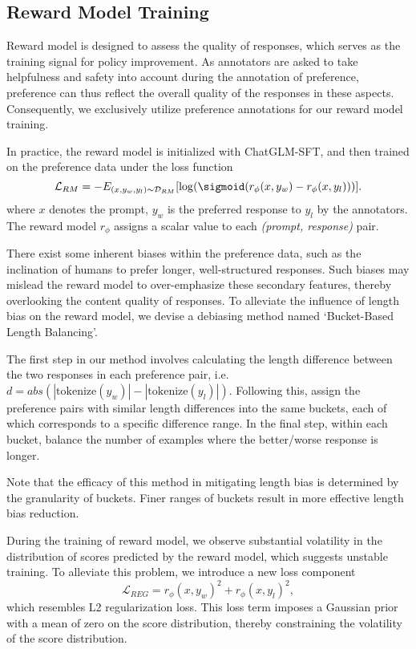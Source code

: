 \subsection{Reward Model Training}

Reward model is designed to assess the quality of responses, which serves as the training signal for policy improvement.
As annotators are asked to take helpfulness and safety into account during the annotation of preference, preference can thus reflect the overall quality of the responses in these aspects. Consequently, we exclusively utilize preference annotations for our reward model training.

In practice, the reward model is initialized with ChatGLM-SFT, and then trained on the preference data under the loss function
\begin{equation}
    \mathcal{L}_{RM} = -E_{(x,y_w,y_l)\sim \mathcal{D}_{RM}} [\log (\sigmoid (r_\phi(x, y_w)-r_\phi(x, y_l)))].
\end{equation}
where $x$ denotes the prompt, $y_w$ is the preferred response to $y_l$ by the annotators. 
The reward model $r_\phi$ assigns a scalar value to each \textit{(prompt, response)} pair.

There exist some inherent biases within the preference data, such as the inclination of humans to prefer longer, well-structured responses. Such biases may mislead the reward model to over-emphasize these secondary features, thereby overlooking the content quality of responses.
To alleviate the influence of length bias on the reward model, we devise a debiasing method named `Bucket-Based Length Balancing'.

The first step in our method involves calculating the length difference between the two responses in each preference pair, i.e. $d=abs(|\mathrm{tokenize}(y_w)|-|\mathrm{tokenize}(y_l)|)$.
Following this, assign the preference pairs with similar length differences into the same buckets, each of which corresponds to a specific difference range.
In the final step, within each bucket, balance the number of examples where the better/worse response is longer.

Note that the efficacy of this method in mitigating length bias is determined by the granularity of buckets. Finer ranges of buckets result in more effective length bias reduction.

During the training of reward model, we observe substantial volatility in the distribution of scores predicted by the reward model, which suggests unstable training. To alleviate this problem, we introduce a new loss component
\begin{equation}
    \mathcal{L}_{REG} = r_\phi(x, y_w)^2+r_\phi(x, y_l)^2,
\end{equation}
which resembles L2 regularization loss.
This loss term imposes a Gaussian prior with a mean of zero on the score distribution, thereby constraining the volatility of the score distribution.

